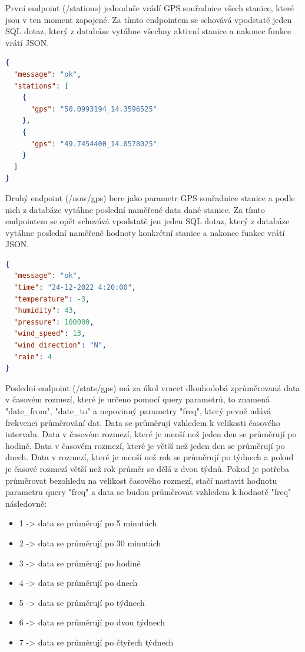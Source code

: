 První endpoint (/stations) jednoduše vrádí GPS souřadnice všech stanice, které jsou v ten moment zapojené.
Za tímto endpointem se schovává vpodstatě jeden SQL dotaz, který z databáze vytáhne všechny aktivní stanice a nakonec funkce vrátí JSON.
\begin{lstlisting}[language=json,firstnumber=1, caption=Příklad požadavku /stations]
{
  "message": "ok",
  "stations": [
    {
      "gps": "50.0993194_14.3596525"
    },
    {
      "gps": "49.7454400_14.0578025"
    }
  ]
}
\end{lstlisting}
Druhý endpoint (/now/{gps}) bere jako parametr GPS souřadnice stanice a podle nich z databáze vytáhne poslední naměřené data dané stanice.
Za tímto endpointem se opět schovává vpodstatě jen jeden SQL dotaz, který z databáze vytáhne poslední naměřené hodnoty konkrétní stanice a nakonec funkce vrátí JSON.
\begin{lstlisting}[language=json,firstnumber=1, caption=Příklad požadavku /now/{gps} ]
{
  "message": "ok",
  "time": "24-12-2022 4:20:00",
  "temperature": -3,
  "humidity": 43,
  "pressure": 100000,
  "wind_speed": 13,
  "wind_direction": "N",
  "rain": 4
}
\end{lstlisting}
Poslední endpoint (/stats/{gps}) má za úkol vracet dlouhodobá zprůměrovaná data v časovém rozmezí, které je určeno pomocí query parametrů,
to znamená "date\_from", "date\_to" a nepovinný parametry "freq", který pevně udává frekvenci průměrování dat. Data se průměrují vzhledem k velikosti časového intervalu.
Data v časovém rozmezí, které je menší než jeden den se průměrují po hodině.
Data v časovém rozmezí, které je větší než jeden den se průměrují po dnech. Data v rozmezí, které je menší než rok se průměrují po týdnech
a pokud je časové rozmezí větší než rok průměr se dělá z dvou týdnů. Pokud je potřeba průměrovat bezohledu na velikost časového rozmezí,
stačí nastavit hodnotu parametru query "freq" a data se budou průměrovat vzhledem k hodnotě "freq" následovně:
\begin{itemize}
  \item 1 -> data se průměrují po 5 minutách
  \item 2 -> data se průměrují po 30 minutách
  \item 3 -> data se průměrují po hodině 
  \item 4 -> data se průměrují po dnech 
  \item 5 -> data se průměrují po týdnech 
  \item 6 -> data se průměrují po dvou týdnech 
  \item 7 -> data se průměrují po čtyřech týdnech 
\end{itemize}
